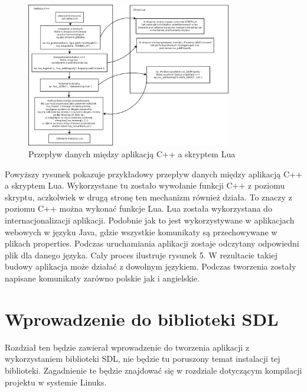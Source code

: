 \begin{figure}[h]
    \centering
    \includegraphics[width=0.8\textwidth,natwidth=410,natheight=142]{./Pictures/lua_skrypty.png}
    \caption{Przepływ danych między aplikacją C++ a skryptem Lua}
\end{figure}

Powyższy rysunek pokazuje przykładowy przepływ danych między aplikacją C++ a skryptem Lua. Wykorzystane tu zostało wywołanie funkcji C++ z poziomu skryptu, aczkolwiek w drugą stronę ten mechanizm również działa. To znaczy z poziomu C++ można wykonać funkcje Lua. Lua została wykorzystana do internacjonalizacji aplikacji. Podobnie jak to jest wykorzystywane w aplikacjach webowych w języku Java, gdzie wszystkie komunikaty są przechowywane w plikach properties. Podczas uruchamiania aplikacji zostaje odczytany odpowiedni plik dla danego języka. Cały proces ilustruje rysunek 5. W rezultacie takiej budowy aplikacja może działać z dowolnym językiem. Podczas tworzenia zostały napisane komunikaty zarówno polskie jak i angielskie.


\section{Wprowadzenie do biblioteki SDL}
Rozdział ten będzie zawierał wprowadzenie do tworzenia aplikacji z wykorzystaniem biblioteki SDL, nie będzie tu poruszony temat instalacji tej biblioteki. Zagadnienie te będzie znajdować się w rozdziale dotyczącym kompilacji projektu w systemie Linuks. 

